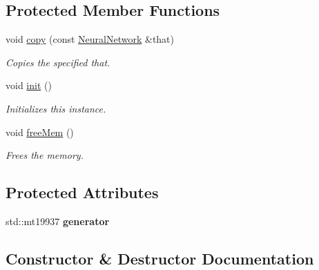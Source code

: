 \subsection*{Protected Member Functions}
\begin{DoxyCompactItemize}
\item 
void \hyperlink{class_n_n_t_lib_1_1_neural_network_af5d47358b8619b32506b77b916bc8d5c}{copy} (const \hyperlink{class_n_n_t_lib_1_1_neural_network}{Neural\+Network} \&that)
\begin{DoxyCompactList}\small\item\em Copies the specified that. \end{DoxyCompactList}\item 
void \hyperlink{class_n_n_t_lib_1_1_neural_network_a84ad44405463ad6f869525b81447e46d}{init} ()
\begin{DoxyCompactList}\small\item\em Initializes this instance. \end{DoxyCompactList}\item 
void \hyperlink{class_n_n_t_lib_1_1_neural_network_ad9a5359eb94a5358d5813e45e35b7b2d}{free\+Mem} ()
\begin{DoxyCompactList}\small\item\em Frees the memory. \end{DoxyCompactList}\end{DoxyCompactItemize}
\subsection*{Protected Attributes}
\begin{DoxyCompactItemize}
\item 
\hypertarget{class_n_n_t_lib_1_1_neural_network_a12f68bf955726ebafa4020d10b4284b6}{}std\+::mt19937 {\bfseries generator}\label{class_n_n_t_lib_1_1_neural_network_a12f68bf955726ebafa4020d10b4284b6}

\end{DoxyCompactItemize}


\subsection{Constructor \& Destructor Documentation}
\hypertarget{class_n_n_t_lib_1_1_neural_network_ab49cda4bda3cba756cb206727e429ebd}{}
